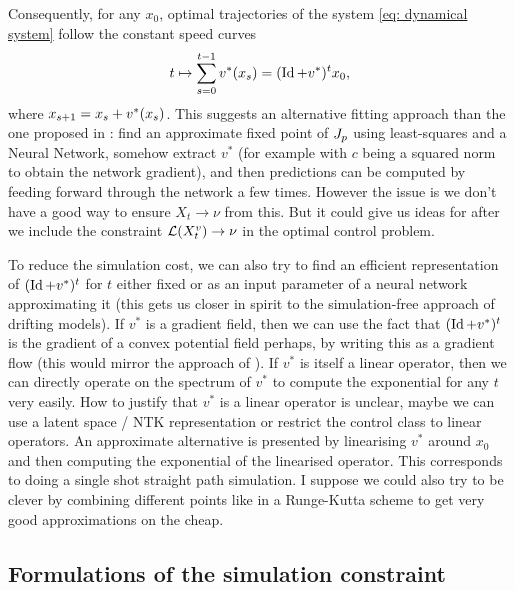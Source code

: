 \documentclass[twoside,10pt]{../jmlr}
\begin{document}
Consequently, for any $x_0$, optimal trajectories of the system \eqref{eq: dynamical system} follow the constant speed curves
 \begin{align}
    t\mapsto \sum_{s=0}^{t-1} v^*(x_s)= (\operatorname{Id}+v^*)^t x_0,
\end{align} where $x_{s+1}=x_s+v^*(x_s)$.
This suggests an alternative fitting approach than the one proposed in \cite{deng2026generative}: find an approximate fixed point of $J_p$ using least-squares and a Neural Network, somehow extract $v^*$ (for example with $c$ being a squared norm to obtain the network gradient), and then predictions can be computed by feeding forward through the network a few times. However the issue is we don't have a good way to ensure $X_t\to \nu$ from this. But it could give us ideas for after we include the constraint $\mathcal{L}(X_t^v)\to\nu$ in the optimal control problem. 

To reduce the simulation cost, we can also try to find an efficient representation of $(\operatorname{Id} + v^*)^t$ for $t$ either fixed or as an input parameter of a neural network approximating it (this gets us closer in spirit to the simulation-free approach of drifting models). If $v^*$ is a gradient field, then we can use the fact that $(\operatorname{Id} + v^*)^t$ is the gradient of a convex potential field perhaps, by writing this as a gradient flow (this would mirror the approach of \cite{PDRLOT}). If $v^*$ is itself a linear operator, then we can directly operate on the spectrum of $v^*$ to compute the exponential for any $t$ very easily. How to justify that $v^*$ is a linear operator is unclear, maybe we can use a latent space / NTK representation or restrict the control class to linear operators. An approximate alternative is presented by linearising $v^*$ around $x_0$ and then computing the exponential of the linearised operator. This corresponds to doing a single shot straight path simulation. I suppose we could also try to be clever by combining different points like in a Runge-Kutta scheme to get very good approximations on the cheap.




\subsection{Formulations of the simulation constraint}
\end{document}
